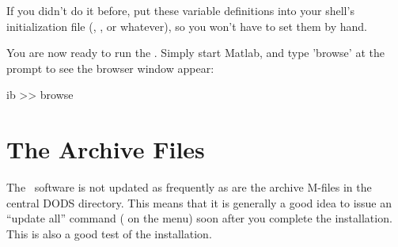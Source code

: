 If you didn't do it before, put these variable definitions into your
shell's initialization file (, ,
 or whatever), so you won't have to set them by hand.

You are now ready to run the \GUI. Simply start Matlab, and
type 'browse' at the prompt to see the browser window appear:

\begin{vcode}{ib}
>> browse
\end{vcode}


\section{The Archive Files}
\label{install,archive}

The \GUI\ software is not updated as frequently as are the archive
M-files in the central DODS directory. This means that it is generally
a good idea to issue an ``update all'' command ( on the
 menu) soon after you complete the installation. This
is also a good test of the installation.




